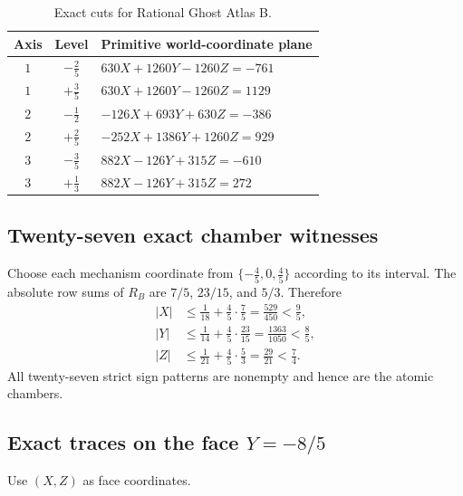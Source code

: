 \documentclass[11pt,openany]{book}
\theoremstyle{polyplain}
\theoremstyle{polydef}
\begin{document}
\begin{table}[htbp]
\centering
\small
\begin{tabular}{ccl}
\toprule
Axis & Level & Primitive world-coordinate plane\\
\midrule
$1$ & $-\frac25$ & $630X+1260Y-1260Z=-761$\\
$1$ & $+\frac35$ & $630X+1260Y-1260Z=1129$\\
$2$ & $-\frac12$ & $-126X+693Y+630Z=-386$\\
$2$ & $+\frac25$ & $-252X+1386Y+1260Z=929$\\
$3$ & $-\frac35$ & $882X-126Y+315Z=-610$\\
$3$ & $+\frac13$ & $882X-126Y+315Z=272$\\
\bottomrule
\end{tabular}
\caption{Exact cuts for Rational Ghost Atlas B.}
\label{tab:ghost-b-planes}
\end{table}

\subsection{Twenty-seven exact chamber witnesses}

Choose each mechanism coordinate from $\{-\frac45,0,\frac45\}$ according to its interval. The absolute row sums of $R_B$ are $7/5$, $23/15$, and $5/3$. Therefore
\begin{align*}
|X|&\le\frac1{18}+\frac45\cdot\frac75=\frac{529}{450}<\frac95,\\
|Y|&\le\frac1{14}+\frac45\cdot\frac{23}{15}=\frac{1363}{1050}<\frac85,\\
|Z|&\le\frac1{21}+\frac45\cdot\frac53=\frac{29}{21}<\frac74.
\end{align*}
All twenty-seven strict sign patterns are nonempty and hence are the atomic chambers.

\subsection{Exact traces on the face \texorpdfstring{$Y=-8/5$}{Y=-8/5}}

Use $(X,Z)$ as face coordinates.
\end{document}
